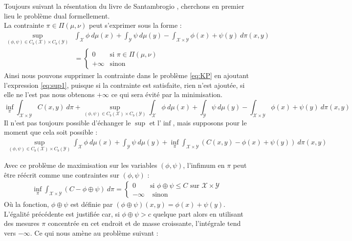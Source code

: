 \documentclass[a4paper,12pt]{article}
\begin{document}
Toujours suivant la résentation du livre de Santambrogio \cite{santambrogio2015optimal}, cherchons en premier lieu le problème dual formellement. \\
La contrainte $\pi\in\Pi(\mu,\nu)$ peut s'exprimer sous la forme : 
\begin{align}
\sup_{(\phi,\psi)\in C_b(\mathcal{X})\times C_b(\mathcal{Y})}& \int_{\mathcal{X}} \phi\ d\mu (x) + \int_{\mathcal{Y}}\psi\  d\mu(y) - \int_{\mathcal{X}\times\mathcal{Y}}\phi(x)+\psi(y)\ d\pi(x,y)\label{eq:sup1}\\
&= \left\{\begin{array}{cl}
0 & \text{si } \pi \in\Pi(\mu,\nu)\\
+\infty & \text{sinon}
\end{array}\right.\nonumber
\end{align}
Ainsi nous pouvons supprimer la contrainte dans le problème \eqref{eq:KP} en ajoutant l'expression \eqref{eq:sup1}, puisque si la contrainte est satisfaite, rien n'est ajoutée, si elle ne l'est pas nous obtenons $+\infty$ ce qui sera évité par la minimisation. 
$$
\inf_{\pi} \int_{\mathcal{X}\times\mathcal{Y}} C(x,y)\ d\pi + \sup_{(\phi,\psi)\in C_b(\mathcal{X})\times C_b(\mathcal{Y})} \int_{\mathcal{X}} \phi\ d\mu (x) + \int_{\mathcal{Y}}\psi\  d\mu(y) - \int_{\mathcal{X}\times\mathcal{Y}}\phi(x)+\psi(y)\ d\pi(x,y)
$$
Il n'est pas toujours possible d'échanger le $\sup$ et l'$\inf$, mais supposons pour le moment que cela soit possible : 
\begin{align}
\sup_{(\phi,\psi)\in C_b(\mathcal{X})\times C_b(\mathcal{Y})} \int_{\mathcal{X}} \phi\ d\mu (x) + \int_{\mathcal{Y}}\psi\  d\mu(y) + \inf_{\pi} \int_{\mathcal{X}\times\mathcal{Y}}(C(x,y) - \phi(x)+\psi(y))\ d\pi(x,y)
\label{eq:infsupexchange}
\end{align}

Avec ce problème de maximisation sur les variables $(\phi,\psi)$, l'infimum en $\pi$ peut être réécrit comme une contraintes sur $(\phi,\psi)$ : 
\begin{align}
\inf_{\pi} \int_{\mathcal{X}\times\mathcal{Y}}(C - \phi\oplus\psi) \ d\pi = 
\left\{
\begin{array}{cl}
0 & \text{si } \phi\oplus\psi\leq C \text{ sur } \mathcal{X}\times\mathcal{Y}\\
-\infty &\text{ sinon}
\end{array}
\right.
\end{align}
Où la fonction, $\phi\oplus\psi$ est définie par $(\phi\oplus\psi)(x,y) = \phi(x)+\psi(y)$. L'égalité précédente est justifiée car, si $\phi\oplus\psi>c$ quelque part alors en utilisant des mesures $\pi$ concentrée en cet endroit et de masse croissante, l'intégrale tend vers $-\infty$. Ce qui nous amène au problème suivant : \\
\end{document}

